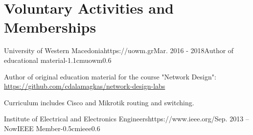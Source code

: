 \documentclass{mycv}
\begin{document}
	\section{Voluntary Activities and Memberships}
	\vspace*{0.125cm}	
	\begin{EntryDatedLogo}{University of Western Macedonia}{https://uowm.gr}{Mar. 2016 - 2018}{Author of educational material}{-1.1cm}{uowm}{0.6}
		\begin{Itemize}
			\item Author of original education material for the course "Network Design": \url{https://github.com/cdalamagkas/network-design-labs}
			\item Curriculum includes Cisco and Mikrotik routing and switching.
		\end{Itemize}
	\end{EntryDatedLogo}

	\vspace*{0.5cm}

	\begin{EntryDatedLogo}{Institute of Electrical and Electronics Engineers}{https://www.ieee.org/}{Sep. 2013 -- Now}{IEEE Member}{-0.5cm}{ieee}{0.6}
	\end{EntryDatedLogo}
\end{document}
